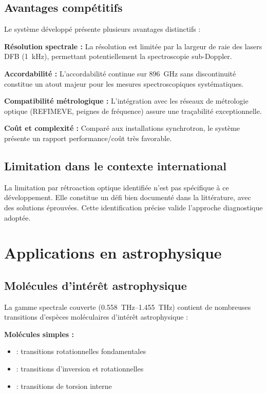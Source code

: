 \subsection{Avantages compétitifs}

Le système développé présente plusieurs avantages distinctifs :

\textbf{Résolution spectrale :} La résolution est limitée par la largeur de raie des lasers DFB (\SI{1}{\kHz}), permettant potentiellement la spectroscopie sub-Doppler.

\textbf{Accordabilité :} L'accordabilité continue sur \SI{896}{\GHz} sans discontinuité constitue un atout majeur pour les mesures spectroscopiques systématiques.

\textbf{Compatibilité métrologique :} L'intégration avec les réseaux de métrologie optique (REFIMEVE, peignes de fréquence) assure une traçabilité exceptionnelle.

\textbf{Coût et complexité :} Comparé aux installations synchrotron, le système présente un rapport performance/coût très favorable.

\subsection{Limitation dans le contexte international}

La limitation par rétroaction optique identifiée n'est pas spécifique à ce développement. Elle constitue un défi bien documenté dans la littérature, avec des solutions éprouvées. Cette identification précise valide l'approche diagnostique adoptée.

\section{Applications en astrophysique}

\subsection{Molécules d'intérêt astrophysique}

La gamme spectrale couverte (\SIrange{0.558}{1.455}{\THz}) contient de nombreuses transitions d'espèces moléculaires d'intérêt astrophysique :

\textbf{Molécules simples :}
\begin{itemize}
    \item \HdO{} : transitions rotationnelles fondamentales
    \item \NHtrois{} : transitions d'inversion et rotationnelles
    \item \CHtroisOH{} : transitions de torsion interne
\end{itemize}

